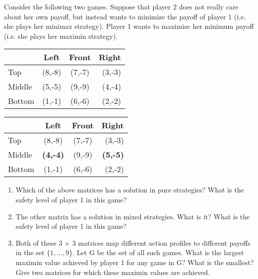 \documentclass[../main.tex]{subfiles}
\begin{document}
\begin{question}[Minimax]
	Consider the following two games. Suppose that player 2 does not really care about her own payoff, but instead wants to minimize the payoff of player 1 (i.e. she plays her minimax strategy). Player 1 wants to maximize her minimum payoff (i.e. she plays her maximin strategy).
	
	\begin{center}
	\begin{tabular}{|l|c|c|r|}
	    \hline
	    & Left & Front & Right \\
	    \hline
	    Top & (8,-8) & (7,-7) & (3,-3) \\
	    \hline
	    Middle & (5,-5) & (9,-9) & (4,-4) \\
	    \hline
	    Bottom & (1,-1) & (6,-6) & (2,-2) \\
	    \hline
	\end{tabular}
	\quad
	\begin{tabular}{|l|c|c|r|}
	    \hline
	    & Left & Front & Right \\
	    \hline
	    Top & (8,-8) & (7,-7) & (3,-3) \\
	    \hline
	    Middle & \textbf{(4,-4)} & (9,-9) & \textbf{(5,-5)} \\
	    \hline
	    Bottom & (1,-1) & (6,-6) & (2,-2) \\
	    \hline
	\end{tabular}
	\end{center}
	
	\begin{enumerate}
		\item Which of the above matrices has a solution in pure strategies? What is the safety level of player 1 in this game?
		\item The other matrix has a solution in mixed strategies. What is it? What is the safety level of player 1 in this game?
		\item Both of these 3 $\times$ 3 matrices map different action profiles to different payoffs in the set $\{1, ... ,9\}$.
		Let G be the set of all such games. What is the largest maximin value achieved by player 1 for any
		game in G? What is the smallest? Give two matrices for which these maximin values are achieved.
	\end{enumerate}
	
\end{question}
\end{document}
